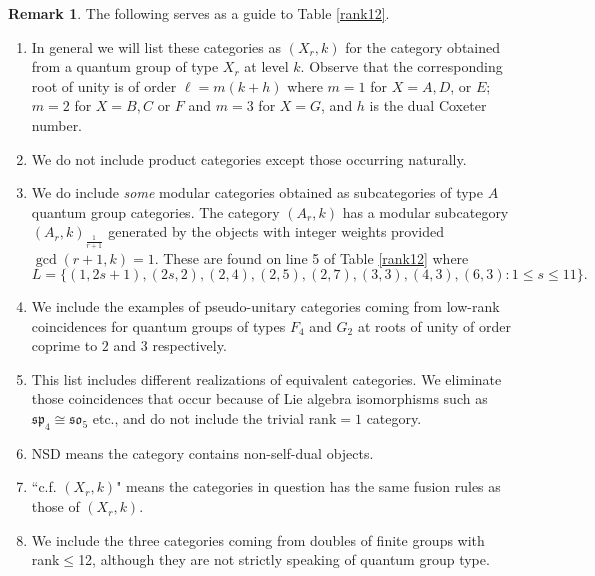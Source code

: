 \documentclass[12pt,psamsfonts]{amsart}
\numberwithin{equation}{section}
\theoremstyle{definition}
\newtheorem{remark}[theorem]{Remark}
\begin{document}
\begin{remark}  The following serves as a guide to Table \ref{rank12}.

\begin{enumerate}
\item In general we will list these categories as $(X_r,k)$ for the category obtained from
a quantum group of type $X_r$ at level $k$.  Observe that the corresponding root of unity
is of order $\ell=m(k+h)$ where $m=1$ for $X=A,D$, or $E$; $m=2$ for $X=B,C$ or $F$ and $m=3$ for $X=G$, and $h$ is the dual Coxeter number.

    \item We do
not include product categories except those occurring naturally.

\item We do include \textit{some} modular categories obtained as subcategories of type $A$ quantum group categories. The category $(A_r,k)$ has a modular subcategory $(A_r,k)_{\frac{1}{r+1}}$ generated by the objects with integer weights provided $\gcd(r+1,k)=1$.  These are found on line 5 of Table \ref{rank12} where $$L=\{(1,2s+1),(2s,2),(2,4),(2,5),(2,7),(3,3),(4,3),(6,3): 1\leq s\leq 11\}.$$

\item We include the examples of pseudo-unitary categories coming from low-rank coincidences for quantum groups of types $F_4$ and $G_2$ at roots of unity of order coprime to $2$ and $3$ respectively.
\item This list includes different realizations of equivalent categories.  We eliminate those coincidences that occur because of Lie algebra isomorphisms
such as $\mathfrak{sp}_4\cong \mathfrak{so}_5$ etc., and do not include the trivial rank$=1$ category.
        \item NSD means the category contains non-self-dual objects.
        \item  ``c.f. $(X_r,k)$" means the
categories in question has the same fusion rules as those of $(X_r,k)$.
\item We include the three categories
coming from doubles of finite groups with rank$\leq$12, although they are not strictly speaking of quantum group type.
\end{enumerate}
\end{remark}
\end{document}
